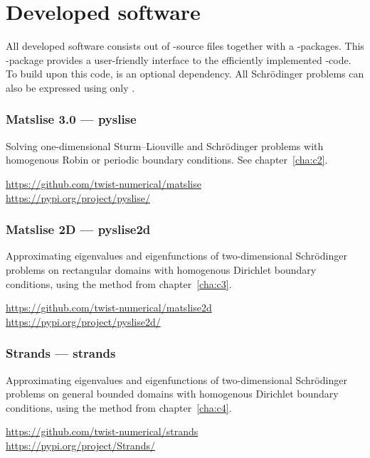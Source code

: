 


\chapter*{Developed software}

All developed software consists out of \cpp{}-source files together with a \lpython{}-packages. This \lpython{}-package provides a user-friendly interface to the efficiently implemented \cpp{}-code. To build upon this code, \lpython{} is an optional dependency. All Schrödinger problems can also be expressed using only \cpp{}.

\subsection*{Matslise 3.0 --- pyslise}

Solving one-dimensional Sturm--Liouville and Schrödinger problems with homogenous Robin or periodic boundary conditions. See chapter~\ref{cha:c2}.

\url{https://github.com/twist-numerical/matslise} \\
\url{https://pypi.org/project/pyslise/}


\subsection*{Matslise 2D --- pyslise2d}

Approximating eigenvalues and eigenfunctions of two-dimensional Schrödinger problems on rectangular domains with homogenous Dirichlet boundary conditions, using the method from chapter~\ref{cha:c3}.

\url{https://github.com/twist-numerical/matslise2d} \\
\url{https://pypi.org/project/pyslise2d/}


\subsection*{Strands --- strands}

Approximating eigenvalues and eigenfunctions of two-dimensional Schrödinger problems on general bounded domains with homogenous Dirichlet boundary conditions, using the method from chapter~\ref{cha:c4}.

\url{https://github.com/twist-numerical/strands} \\
\url{https://pypi.org/project/Strands/}


\stopchapter
